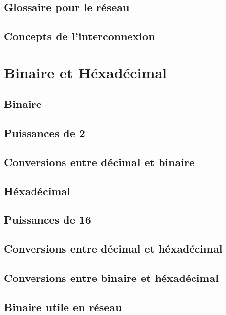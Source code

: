 \documentclass[12pt]{article}
\begin{document}
\subsection{Glossaire pour le réseau}

\subsection{Concepts de l’interconnexion}

\section{Binaire et Héxadécimal}


\subsection{Binaire}


\subsection{Puissances de 2}


\subsection{Conversions entre décimal et binaire}

\subsection{Héxadécimal}


\subsection{Puissances de 16}


\subsection{Conversions entre décimal et héxadécimal}


\subsection{Conversions entre binaire et héxadécimal}


\subsection{Binaire utile en réseau}
\end{document}
